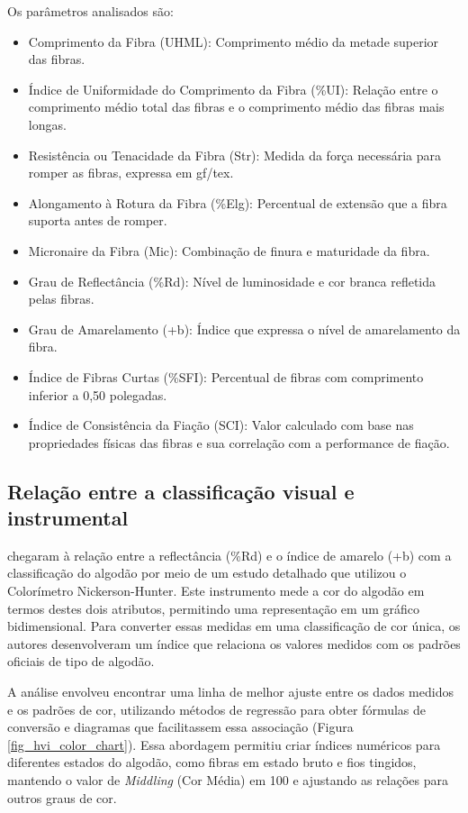 Os parâmetros analisados são:

\begin{itemize}
	\item Comprimento da Fibra (UHML): Comprimento médio da metade superior das fibras.
	\item Índice de Uniformidade do Comprimento da Fibra (\%UI): Relação entre o comprimento médio total das fibras e o comprimento médio das fibras mais longas.
	\item Resistência ou Tenacidade da Fibra (Str): Medida da força necessária para romper as fibras, expressa em gf/tex.
	\item Alongamento à Rotura da Fibra (\%Elg): Percentual de extensão que a fibra suporta antes de romper.
	\item Micronaire da Fibra (Mic): Combinação de finura e maturidade da fibra.
	\item Grau de Reflectância (\%Rd): Nível de luminosidade e cor branca refletida pelas fibras.
	\item Grau de Amarelamento (+b): Índice que expressa o nível de amarelamento da fibra.
	\item Índice de Fibras Curtas (\%SFI): Percentual de fibras com comprimento inferior a 0,50 polegadas.
	\item Índice de Consistência da Fiação (SCI): Valor calculado com base nas propriedades físicas das fibras e sua correlação com a performance de fiação.
\end{itemize}



\subsection{Relação entre a classificação visual e instrumental}
 
 chegaram à relação entre a reflectância (\%Rd) e o índice de amarelo (+b) com a classificação do algodão por meio de um estudo detalhado que utilizou o Colorímetro Nickerson-Hunter. Este instrumento mede a cor do algodão em termos destes dois atributos, permitindo uma representação em um gráfico bidimensional. Para converter essas medidas em uma classificação de cor única, os autores desenvolveram um índice que relaciona os valores medidos com os padrões oficiais de tipo de algodão. 

A análise envolveu encontrar uma linha de melhor ajuste entre os dados medidos e os padrões de cor, utilizando métodos de regressão para obter fórmulas de conversão e diagramas que facilitassem essa associação (Figura \ref{fig_hvi_color_chart}). Essa abordagem permitiu criar índices numéricos para diferentes estados do algodão, como fibras em estado bruto e fios tingidos, mantendo o valor de \textit{Middling} (Cor Média) em 100 e ajustando as relações para outros graus de cor.

